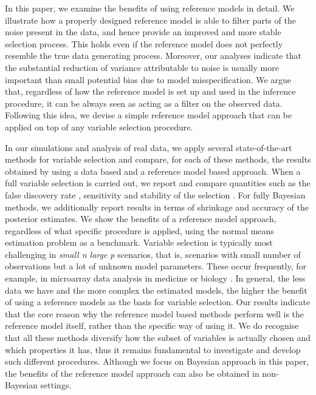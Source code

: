 \documentclass[american,]{article}
\theoremstyle{definition}
\begin{document}
In this paper, we examine the benefits of using reference models in
detail. We illustrate how a properly designed reference model is able
to filter parts of the noise present in the data, and hence provide an
improved and more stable selection process. This holds even if the
reference model does not perfectly resemble the true data generating
process. Moreover, our analyses indicate that the substantial
reduction of variance attributable to noise is usually more important
than small potential bias due to model misspecification.  We argue
that, regardless of how the reference model is set up and used in the
inference procedure, it can be always seen as acting as a filter on
the observed data. Following this idea, we devise a simple reference
model approach that can be applied on top of any variable selection
procedure.

In our simulations and analysis of real data, we apply several
state-of-the-art methods for variable selection and compare, for each
of these methods, the results obtained by using a data based and a
reference model based approach. When a full variable selection is
carried out, we report and compare quantities such as the false
discovery rate \citep{paper:fdr_BH}, sensitivity and stability of the
selection \citep{paper:stability}. For fully Bayesian methods, we
additionally report results in terms of shrinkage and accuracy of the
posterior estimates.  We show the benefits of a reference model
approach, regardless of what specific procedure is applied, using the
normal means estimation problem as a benchmark.  Variable selection is
typically most challenging in \textit{small n large p} scenarios, that
is, scenarios with small number of observations but a lot of unknown
model parameters.  These occur frequently, for example, in microarray
data analysis in medicine or biology
\citep{dudoit2003multiple,liao2007logistic,paper:efron}.  In general,
the less data we have and the more complex the estimated models, the
higher the benefit of using a reference models as the basis for
variable selection.  Our results indicate that the core reason why the
reference model based methods perform well is the reference model
itself, rather than the specific way of using it. We do recognise that
all these methods diversify how the subset of variables is actually
chosen and which properties it has, thus it remains fundamental to
investigate and develop such different procedures. Although we focus
on Bayesian approach in this paper, the benefits of the reference
model approach can also be obtained in non-Bayesian settings.
\end{document}
